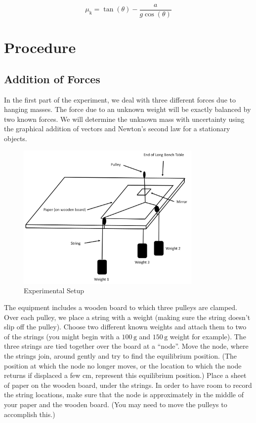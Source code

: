 \begin{equation}
\mu_\text{k} = \tan(\theta)-\frac{a}{g \cos(\theta)}
\end{equation}

\section{Procedure}

\subsection{Addition of Forces}

In the first part of the experiment, we deal with three different forces due to hanging masses. The force due to an unknown weight will be exactly balanced by two known forces. We will determine the unknown mass with uncertainty using the graphical addition of vectors and Newton's second law for a stationary objects. \begin{figure}[h]
    \begin{center}
        \includegraphics[width=0.8\textwidth]{./Exp1-4/pic/image14.jpg}
    \end{center}
    \caption{Experimental Setup}
    \label{fig:setup}
\end{figure}

The equipment includes a wooden board to which three pulleys are clamped. Over each pulley, we place a string with a weight (making sure the string doesn't slip off the pulley). Choose two different known weights and attach them to two of the strings (you might begin with a $100\,\mathrm{g}$ and $150\,\mathrm{g}$ weight for example). The three strings are tied together over the board at a ``node''. Move the node, where the strings join, around gently and try to find the equilibrium position. (The position at which the node no longer moves, or the location to which the node returns if displaced a few cm, represent this equilibrium position.)  Place a sheet of paper on the wooden board, under the strings. In order to have room to record the string locations, make sure that the node is approximately in the middle of your paper and the wooden board. (You may need to move the pulleys to accomplish this.) \myskip

